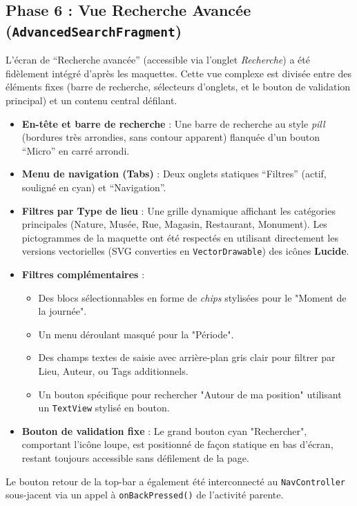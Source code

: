 \documentclass{article}
\begin{document}
\subsection{Phase 6 : Vue Recherche Avancée (\texttt{AdvancedSearchFragment})}
L'écran de ``Recherche avancée'' (accessible via l'onglet \textit{Recherche}) a été fidèlement intégré d'après les maquettes. Cette vue complexe est divisée entre des éléments fixes (barre de recherche, sélecteurs d'onglets, et le bouton de validation principal) et un contenu central défilant.
\begin{itemize}
    \item \textbf{En-tête et barre de recherche} : Une barre de recherche au style \textit{pill} (bordures très arrondies, sans contour apparent) flanquée d'un bouton ``Micro'' en carré arrondi.
    \item \textbf{Menu de navigation (Tabs)} : Deux onglets statiques ``Filtres'' (actif, souligné en cyan) et ``Navigation''.
    \item \textbf{Filtres par Type de lieu} : Une grille dynamique affichant les catégories principales (Nature, Musée, Rue, Magasin, Restaurant, Monument). Les pictogrammes de la maquette ont été respectés en utilisant directement les versions vectorielles (SVG converties en \texttt{VectorDrawable}) des icônes \textbf{Lucide}.
    \item \textbf{Filtres complémentaires} : 
    \begin{itemize}
        \item Des blocs sélectionnables en forme de \textit{chips} stylisées pour le "Moment de la journée".
        \item Un menu déroulant masqué pour la "Période".
        \item Des champs textes de saisie avec arrière-plan gris clair pour filtrer par Lieu, Auteur, ou Tags additionnels.
        \item Un bouton spécifique pour rechercher "Autour de ma position" utilisant un \texttt{TextView} stylisé en bouton.
    \end{itemize}
    \item \textbf{Bouton de validation fixe} : Le grand bouton cyan "Rechercher", comportant l'icône loupe, est positionné de façon statique en bas d'écran, restant toujours accessible sans défilement de la page.
\end{itemize}
Le bouton retour de la top-bar a également été interconnecté au \texttt{NavController} sous-jacent via un appel à \texttt{onBackPressed()} de l'activité parente.
\end{document}
